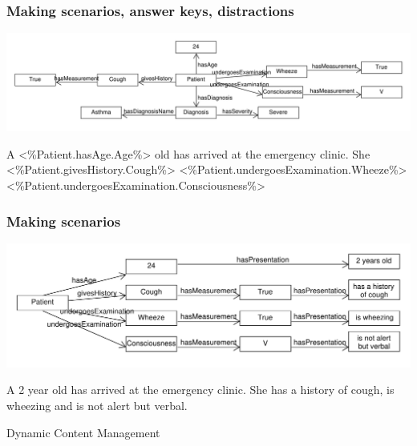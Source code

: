 \documentclass{beamer}
\begin{document}
\begin{frame}[fragile]
\frametitle{Making scenarios, answer keys, distractions}
\includegraphics[scale=0.36]{EntityInstanceGraph}
\begin{semiverbatim}
A <\%Patient.hasAge.Age\%> old has arrived at the 
emergency clinic.  
She <\%Patient.givesHistory.Cough\%> 
<\%Patient.undergoesExamination.Wheeze\%>
<\%Patient.undergoesExamination.Consciousness\%>
\end{semiverbatim}
\end{frame}

\begin{frame}[fragile]
\frametitle{Making scenarios}
\includegraphics[scale=0.45]{PresentationEntityGraph}
\begin{semiverbatim}
	A 2 year old has arrived at the 
	emergency clinic.  
	She has a history of cough, 
	is wheezing
	and is not alert but verbal.
\end{semiverbatim}
\end{frame}

\begin{frame}{Dynamic Content Management}
\end{frame}
\end{document}
